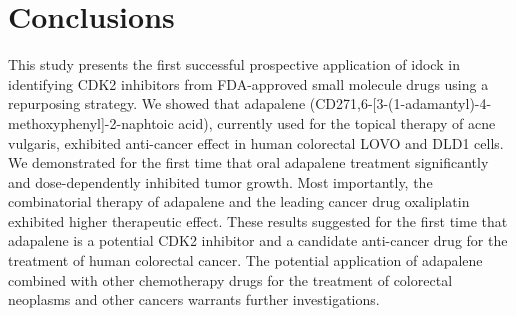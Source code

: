 \section{Conclusions}

This study presents the first successful prospective application of idock \citep{1153,1362} in identifying CDK2 inhibitors from FDA-approved small molecule drugs using a repurposing strategy. We showed that adapalene (CD271,6-[3-(1-adamantyl)-4-methoxyphenyl]-2-naphtoic acid), currently used for the topical therapy of acne vulgaris, exhibited anti-cancer effect in human colorectal LOVO and DLD1 cells. We demonstrated for the first time that oral adapalene treatment significantly and dose-dependently inhibited tumor growth. Most importantly, the combinatorial therapy of adapalene and the leading cancer drug oxaliplatin exhibited higher therapeutic effect. These results suggested for the first time that adapalene is a potential CDK2 inhibitor and a candidate anti-cancer drug for the treatment of human colorectal cancer. The potential application of adapalene combined with other chemotherapy drugs for the treatment of colorectal neoplasms and other cancers warrants further investigations.

\chapterend
